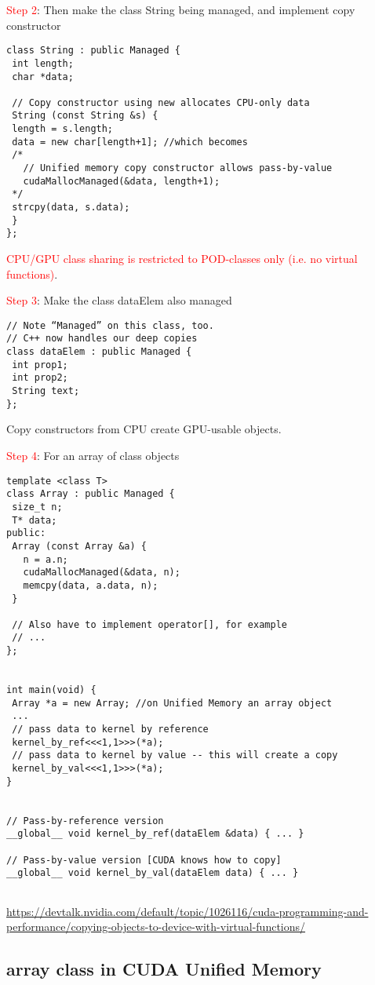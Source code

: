 \textcolor{red}{Step 2}: Then make the class String being managed, and implement copy constructor
\begin{verbatim}
class String : public Managed {
 int length;
 char *data;
 
 // Copy constructor using new allocates CPU-only data
 String (const String &s) {
 length = s.length;
 data = new char[length+1]; //which becomes
 /*
   // Unified memory copy constructor allows pass-by-value
   cudaMallocManaged(&data, length+1);
 */
 strcpy(data, s.data);
 }
};
\end{verbatim}

\textcolor{red}{CPU/GPU class sharing is restricted to POD-classes only (i.e. no
virtual functions)}.

\textcolor{red}{Step 3}: Make the class dataElem also managed
\begin{verbatim}
// Note “Managed” on this class, too.
// C++ now handles our deep copies
class dataElem : public Managed {
 int prop1;
 int prop2;
 String text;
};
\end{verbatim}
Copy constructors from CPU create GPU-usable objects.

\textcolor{red}{Step 4}: For an array of class objects
\begin{verbatim}
template <class T>
class Array : public Managed {
 size_t n;
 T* data;
public:
 Array (const Array &a) {
   n = a.n;
   cudaMallocManaged(&data, n);
   memcpy(data, a.data, n);
 }

 // Also have to implement operator[], for example
 // ...
};


int main(void) {
 Array *a = new Array; //on Unified Memory an array object
 ...
 // pass data to kernel by reference
 kernel_by_ref<<<1,1>>>(*a);
 // pass data to kernel by value -- this will create a copy
 kernel_by_val<<<1,1>>>(*a);
}


// Pass-by-reference version
__global__ void kernel_by_ref(dataElem &data) { ... }

// Pass-by-value version [CUDA knows how to copy]
__global__ void kernel_by_val(dataElem data) { ... }


\end{verbatim}




\url{https://devtalk.nvidia.com/default/topic/1026116/cuda-programming-and-performance/copying-objects-to-device-with-virtual-functions/}

\subsection{array class in CUDA Unified Memory}


